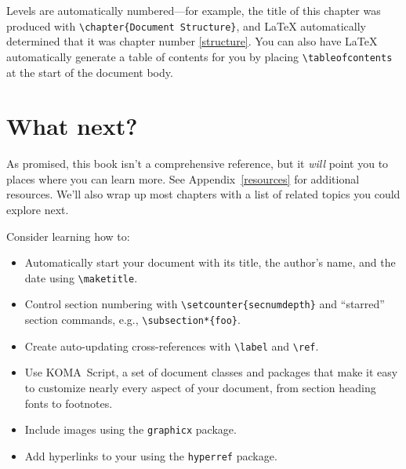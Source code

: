 Levels are automatically numbered---for example,
the title of this chapter was produced with \verb|\chapter{Document Structure}|,
and \LaTeX{} automatically determined that it was chapter number \ref{structure}.
You can also have \LaTeX{} automatically generate a table of contents for you
by placing \verb|\tableofcontents| at the start of the document body.

\section{What next?}

As promised, this book isn't a comprehensive reference,
but it \emph{will} point you to places where you can learn more.
See Appendix~\ref{resources} for additional resources.
We'll also wrap up most chapters with a list of related topics you could
explore next.

Consider learning how to:
\begin{itemize}
\item Automatically start your document with its title, the author's name,
    and the date using \verb|\maketitle|.
\item Control section numbering with \verb|\setcounter{secnumdepth}|
and ``starred'' section commands, e.g., \verb|\subsection*{foo}|.
\item Create auto-updating cross-references with \verb|\label| and \verb|\ref|.
\item Use KOMA~Script, a set of document classes and packages
that make it easy to customize nearly every aspect of your document,
from section heading fonts to footnotes.
\item Include images using the \texttt{graphicx} package.
\item Add hyperlinks to your  using the \texttt{hyperref} package.
\end{itemize}

